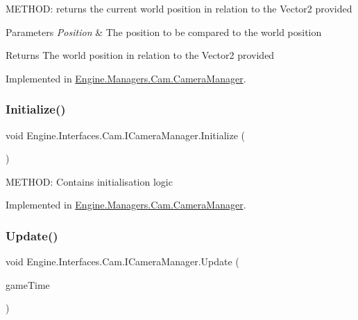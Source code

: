 M\+E\+T\+H\+OD\+: returns the current world position in relation to the Vector2 provided 


\begin{DoxyParams}{Parameters}
{\em Position} & The position to be compared to the world position\\
\hline
\end{DoxyParams}
\begin{DoxyReturn}{Returns}
The world position in relation to the Vector2 provided
\end{DoxyReturn}


Implemented in \hyperlink{a00494_a538af3b5745f1f51e3da217d5c971791}{Engine.\+Managers.\+Cam.\+Camera\+Manager}.

\mbox{\label{a00422_a21e0ce6b0ada068546161ecf02559912}} 
\subsubsection{\texorpdfstring{Initialize()}{Initialize()}}
{\footnotesize\ttfamily void Engine.\+Interfaces.\+Cam.\+I\+Camera\+Manager.\+Initialize (\begin{DoxyParamCaption}{ }\end{DoxyParamCaption})}



M\+E\+T\+H\+OD\+: Contains initialisation logic 



Implemented in \hyperlink{a00494_a6244a0582982e64f49df0a6862768a21}{Engine.\+Managers.\+Cam.\+Camera\+Manager}.

\mbox{\label{a00422_a78a46559249e70181100daff38ef5d6a}} 
\subsubsection{\texorpdfstring{Update()}{Update()}}
{\footnotesize\ttfamily void Engine.\+Interfaces.\+Cam.\+I\+Camera\+Manager.\+Update (\begin{DoxyParamCaption}\item[{Game\+Time}]{game\+Time }\end{DoxyParamCaption})}




